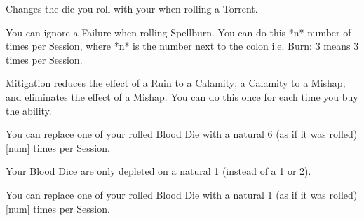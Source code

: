 {



Changes the die you roll with your \INT when rolling a Torrent. 


You can ignore a Failure when rolling Spellburn. You can do this *n* number of times per Session, where *n* is the number next to the
colon i.e. Burn: 3 means 3 times per Session.


Mitigation reduces the effect of a Ruin to a Calamity; a Calamity to a Mishap; and eliminates the effect of a Mishap.  You can do this once for each time you buy the ability.


You can replace one of your rolled Blood Die with a natural 6 (as if it was rolled) [num]  times per Session.  


Your Blood Dice are only depleted on a natural 1 (instead of a 1 or 2). 


You can replace one of your rolled Blood Die with a natural 1 (as if it was rolled) [num] times per Session.




} %